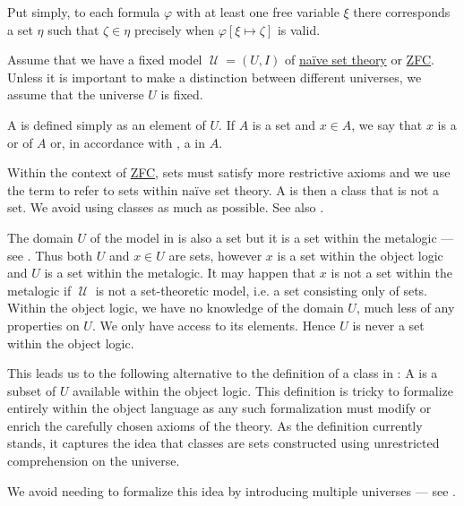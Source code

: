 \begin{definition}
\begin{thmenum}
    Put simply, to each formula \( \varphi \) with at least one free variable \( \xi \) there corresponds a set \( \eta \) such that \( \zeta \in \eta \) precisely when \( \varphi[\xi \mapsto \zeta] \) is valid.
  \end{thmenum}
\end{definition}

\begin{definition}\label{def:set}
  Assume that we have a fixed model \( \mscrU = (U, I) \) of \hyperref[def:naive_set_theory]{na\"ive set theory} or \hyperref[def:zfc]{ZFC}.  Unless it is important to make a distinction between different universes, we assume that the universe \( U \) is fixed.

  A  is defined simply as an element of \( U \). If \( A \) is a set and \( x \in A \), we say that \( x \) is a  or  of \( A \) or, in accordance with , a  in \( A \).

   Within the context of \hyperref[def:zfc]{ZFC}, sets must satisfy more restrictive axioms and we use the term  to refer to sets within na\"ive set theory. A  is then a class that is not a set. We avoid using classes as much as possible. See also .
\end{definition}

\begin{remark}\label{rem:proper_class}
  The domain \( U \) of the model in  is also a set but it is a set within the metalogic --- see . Thus both \( U \) and \( x \in U \) are sets, however \( x \) is a set within the object logic and \( U \) is a set within the metalogic. It may happen that \( x \) is not a set within the metalogic if \( \mscrU \) is not a set-theoretic model, i.e. a set consisting only of sets. Within the object logic, we have no knowledge of the domain \( U \), much less of any properties on \( U \). We only have access to its elements. Hence \( U \) is never a set within the object logic.

  This leads us to the following alternative to the definition of a class in : A  is a subset of \( U \) available within the object logic. This definition is tricky to formalize entirely within the object language as any such formalization must modify or enrich the carefully chosen axioms of the theory. As the definition currently stands, it captures the idea that classes are sets constructed using unrestricted comprehension on the universe.

  We avoid needing to formalize this idea by introducing multiple universes --- see .
\end{remark}

